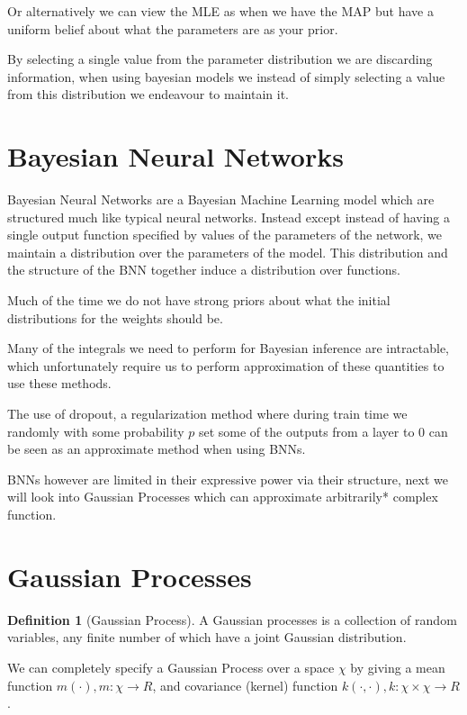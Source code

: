 \documentclass[12pt, a4paper]{report}
\theoremstyle{definition}
\theoremstyle{definition}
\newtheorem{definition}{Definition}[section]
\theoremstyle{definition}
\begin{document}
Or alternatively we can view the MLE as when we have the MAP but have a uniform belief about what the parameters are as your prior.

By selecting a single value from the parameter distribution we are discarding information, when using bayesian models we instead of simply selecting a value from this distribution we endeavour to maintain it.


\section{Bayesian Neural Networks}
\label{sec:BNNs}


Bayesian Neural Networks are a Bayesian Machine Learning model which are structured much like typical neural networks. Instead except instead of having a single output function specified by values of the parameters of the network, we maintain a distribution over the parameters of the model. This distribution and the structure of the BNN together induce a distribution over functions.

Much of the time we do not have strong priors about what the initial distributions for the weights should be.

Many of the integrals we need to perform for Bayesian inference are intractable, which unfortunately require us to perform approximation of these quantities to use these methods.

The use of dropout, a regularization method where during train time we randomly with some probability $p$ set some of the outputs from a layer to 0 can be seen as an approximate method when using BNNs.

BNNs however are limited in their expressive power via their structure, next we will look into Gaussian Processes which can approximate arbitrarily* complex function.

\section{Gaussian Processes}
\label{sec:GaussianProcesses}


\begin{definition}[Gaussian Process]
    A Gaussian processes is a collection of random variables, any finite number of which have a joint Gaussian distribution. \cite[]{rasmussen2003gaussian}
\end{definition}


We can completely specify a Gaussian Process over a space $\chi$ by giving a mean function $m(\cdot), m : \chi \rightarrow R$, and covariance (kernel) function $k(\cdot, \cdot), k: \chi \times \chi \rightarrow R$.
\end{document}

